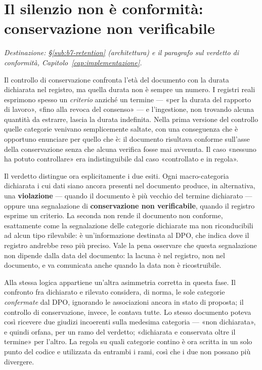\section{Il silenzio non è conformità: conservazione non verificabile}
\label{sec:sv-retention-non-verificabile}

\textit{Destinazione: §\ref{sub:b7-retention} (architettura) e il paragrafo sul verdetto di conformità, Capitolo~\ref{cap:implementazione}.} \medskip

Il controllo di conservazione confronta l'età del documento con la durata dichiarata nel registro, ma quella durata non è sempre un numero. I registri reali esprimono spesso un \emph{criterio} anziché un termine --- «per la durata del rapporto di lavoro», «fino alla revoca del consenso» --- e l'ingestione, non trovando alcuna quantità da estrarre, lascia la durata indefinita. Nella prima versione del controllo quelle categorie venivano semplicemente saltate, con una conseguenza che è opportuno enunciare per quello che è: il documento risultava conforme sull'asse della conservazione senza che alcuna verifica fosse mai avvenuta. Il caso «nessuno ha potuto controllare» era indistinguibile dal caso «controllato e in regola». \medskip

Il verdetto distingue ora esplicitamente i due esiti. Ogni macro-categoria dichiarata i cui dati siano ancora presenti nel documento produce, in alternativa, una \textbf{violazione} --- quando il documento è più vecchio del termine dichiarato --- oppure una segnalazione di \textbf{conservazione non verificabile}, quando il registro esprime un criterio. La seconda non rende il documento non conforme, esattamente come la segnalazione delle categorie dichiarate ma non riconducibili ad alcun tipo rilevabile: è un'informazione destinata al DPO, che indica dove il registro andrebbe reso più preciso. Vale la pena osservare che questa segnalazione non dipende dalla data del documento: la lacuna è nel registro, non nel documento, e va comunicata anche quando la data non è ricostruibile. \medskip

Alla stessa logica appartiene un'altra asimmetria corretta in questa fase. Il confronto fra dichiarato e rilevato considera, di norma, le sole categorie \emph{confermate} dal DPO, ignorando le associazioni ancora in stato di proposta; il controllo di conservazione, invece, le contava tutte. Lo stesso documento poteva così ricevere due giudizi incoerenti sulla medesima categoria --- «non dichiarata», e quindi orfana, per un ramo del verdetto; «dichiarata e conservata oltre il termine» per l'altro. La regola su quali categorie contino è ora scritta in un solo punto del codice e utilizzata da entrambi i rami, così che i due non possano più divergere. \medskip

